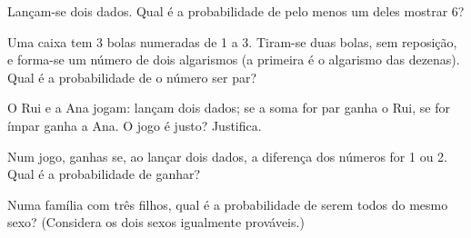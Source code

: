 \documentclass[12pt]{article}
\begin{document}
\begin{exercicios}
  \item Lançam-se dois dados. Qual é a probabilidade de pelo menos um deles mostrar 6?
  \item Uma caixa tem 3 bolas numeradas de 1 a 3. Tiram-se duas bolas, sem reposição, e forma-se um número de dois algarismos (a primeira é o algarismo das dezenas). Qual é a probabilidade de o número ser par?
  \item O Rui e a Ana jogam: lançam dois dados; se a soma for par ganha o Rui, se for ímpar ganha a Ana. O jogo é justo? Justifica.
  \item Num jogo, ganhas se, ao lançar dois dados, a diferença dos números for 1 ou 2. Qual é a probabilidade de ganhar?
  \item Numa família com três filhos, qual é a probabilidade de serem todos do mesmo sexo? (Considera os dois sexos igualmente prováveis.)
\end{exercicios}
\end{document}
